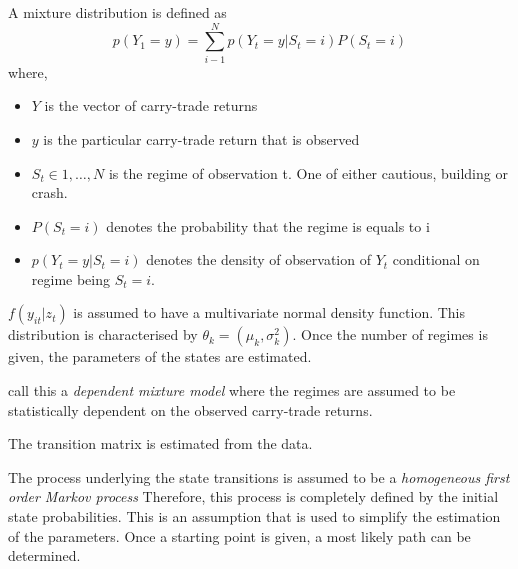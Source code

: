 \documentclass[12pt, a4paper, oneside]{article} %
\begin{document}
A mixture distribution is defined as 
\begin{equation}
p(Y_1 = y) = \sum_{i - 1}^N p(Y_t = y|S_t = i)P(S_t = i)
\end{equation}
where,
\begin{itemize}
\item $Y$ is the vector of carry-trade returns
\item $y$ is the particular carry-trade return that is observed
\item $S_t \in {1, \dots, N}$ is the regime of observation t.  One of either cautious, building or crash.
\item $P(S_t = i)$ denotes the probability that the regime is equals to i 
\item $p(Y_t = y|S_t = i)$ denotes the density of observation of $Y_t$ conditional on regime being $S_t = i$.
\end{itemize}


$f(y_{it}|z_t)$ is assumed to have a multivariate normal density function. This distribution is characterised by $\theta_k = (\mu_k, \sigma_k^2)$. Once the number of regimes is given, the parameters of the states are estimated.  

\citet{depmixS4} call this a \emph{dependent mixture model} where the regimes are assumed to be statistically dependent on the observed carry-trade returns.  

The transition matrix is estimated from the data. 

The process underlying the state transitions is assumed to be a \emph{homogeneous first order Markov process}  Therefore, this process is completely defined by the initial state probabilities. This is an assumption that is used to simplify the estimation of the parameters. Once a starting point is given, a most likely path can be determined.  
\end{document}
